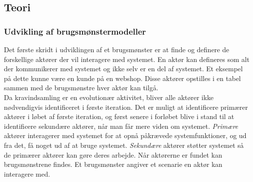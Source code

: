 \subsection{Teori}
\subsubsection{Udvikling af brugsmønstermodeller} %
Det første skridt i udviklingen af et brugsmønster er at finde og definere de forskellige aktører der vil interagere med systemet. En aktør kan defineres som alt der kommunikerer med systemet og ikke selv er en del af systemet. Et eksempel på dette kunne være en kunde på en webshop. Disse aktører opstilles i en tabel sammen med de brugsmønstre hver aktør kan tilgå. \\

\noindent
Da kravindsamling er en evolutionær aktivitet, bliver alle aktører ikke nødvendigvis identificeret i første iteration. Det er muligt at identificere primærer aktører i løbet af første iteration, og først senere i forløbet blive i stand til at identificere sekundære aktører, når man får mere viden om systemet. \textit{Primære} aktører interagerer med systemet for at opnå påkrævede systemfunktioner, og ud fra det, få noget ud af at bruge systemet. \textit{Sekundære} aktører støtter systemet så de primærer aktører kan gøre deres arbejde. Når aktørerne er fundet kan brugsmønstrene findes. Et brugsmønster angiver et scenarie en aktør kan interagere med. \\

